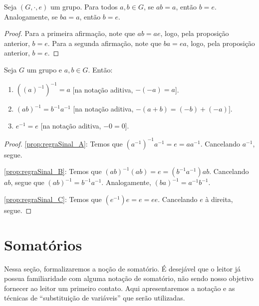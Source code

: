 \begin{corol}[Cancelamento II]\label{prop:group_cancelII}
    Seja $(G,\cdot,e)$ um grupo.
    Para todos $a, b \in G$, se $ab=a$, então $b=e$.
Analogamente, se $ba=a$, então $b=e$.
\end{corol}
\begin{proof}
    Para a primeira afirmação, note que $ab=ae$, logo, pela proposição anterior, $b=e$.
    Para a segunda afirmação, note que $ba=ea$, logo, pela proposição anterior, $b=e$.
\end{proof}

\begin{prop}\label{prop:regraSinal}
    Seja $G$ um grupo e $a, b \in G$.
    Então:
    \begin{enumerate}[label=\alph*)]
        \item $((a)^{-1})^{-1}=a$ [na notação aditiva, $-(-a)=a$].
\label{prop:regraSinal_A}
        \item $(ab)^{-1}=b^{-1}a^{-1}$ [na notação aditiva, $-(a+b)=(-b)+(-a)]$.\label{prop:regraSinal_B}
        \item $e^{-1}=e$ [na notação aditiva, $-0=0$].\label{prop:regraSinal_C}
    \end{enumerate}
\end{prop}
\begin{proof}
    \ref{prop:regraSinal_A}: Temos que $(a^{-1})^{-1}a^{-1}=e=aa^{-1}$.
    Cancelando $a^{-1}$, segue.
    
    \ref{prop:regraSinal_B}: Temos que $(ab)^{-1}(ab)=e=(b^{-1}a^{-1})ab$.
    Cancelando $ab$, segue que $(ab)^{-1}=b^{-1}a^{-1}$.
    Analogamente, $(ba)^{-1}=a^{-1}b^{-1}$.

    \ref{prop:regraSinal_C}: Temos que $(e^{-1})e=e=ee$.
    Cancelando $e$ à direita, segue.


\end{proof}

\section{Somatórios}

Nessa seção, formalizaremos a noção de somatório.
É desejável que o leitor já possua familiaridade com alguma notação de somatório, não sendo nosso objetivo fornecer ao leitor um primeiro contato. Aqui apresentaremos a notação e as técnicas de ``substituição de variáveis'' que serão utilizadas.


